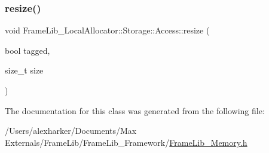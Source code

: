 \subsubsection{\texorpdfstring{resize()}{resize()}}
{\footnotesize\ttfamily void Frame\+Lib\+\_\+\+Local\+Allocator\+::\+Storage\+::\+Access\+::resize (\begin{DoxyParamCaption}\item[{bool}]{tagged,  }\item[{size\+\_\+t}]{size }\end{DoxyParamCaption})\hspace{0.3cm}{\ttfamily [inline]}}



The documentation for this class was generated from the following file\+:\begin{DoxyCompactItemize}
\item 
/\+Users/alexharker/\+Documents/\+Max Externals/\+Frame\+Lib/\+Frame\+Lib\+\_\+\+Framework/\hyperlink{_frame_lib___memory_8h}{Frame\+Lib\+\_\+\+Memory.\+h}\end{DoxyCompactItemize}
